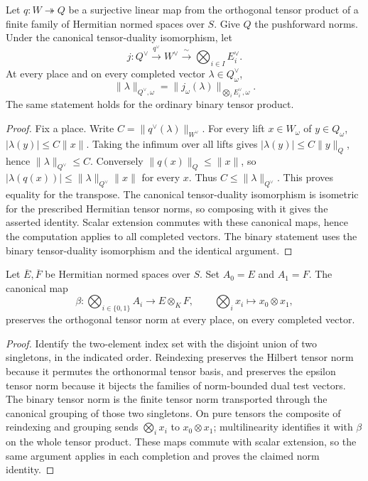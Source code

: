\begin{lemma}
\label{lem:tensor-quotient-dual-norm}
\leanok
Let $q:W\twoheadrightarrow Q$ be a surjective linear map from the orthogonal
tensor product of a finite family of Hermitian normed spaces over $S$.
Give $Q$ the pushforward norms. Under the canonical tensor-duality isomorphism,
let
\[
 j:Q^{\vee}\xrightarrow{q^{\vee}}W^{\vee}
       \xrightarrow{\ \sim\ }\bigotimes_{i\in I}E_i^{\vee}.
\]
At every place and on every completed vector $\lambda\in Q_\omega^{\vee}$,
\[
 \|\lambda\|_{Q^{\vee},\omega}
   =\|j_\omega(\lambda)\|_{\bigotimes_i E_i^{\vee},\omega}.
\]
The same statement holds for the ordinary binary tensor product.
\end{lemma}
\begin{proof}
Fix a place. Write $C=\|q^{\vee}(\lambda)\|_{W^{\vee}}$.
For every lift $x\in W_\omega$ of $y\in Q_\omega$,
$|\lambda(y)|\leq C\|x\|$. Taking the infimum over all lifts gives
$|\lambda(y)|\leq C\|y\|_Q$, hence $\|\lambda\|_{Q^{\vee}}\leq C$.
Conversely $\|q(x)\|_Q\leq\|x\|$, so
$|\lambda(q(x))|\leq\|\lambda\|_{Q^{\vee}}\|x\|$ for every $x$.
Thus $C\leq\|\lambda\|_{Q^{\vee}}$. This proves equality for the transpose.
The canonical tensor-duality isomorphism is isometric for the prescribed
Hermitian tensor norms, so composing with it gives the asserted identity.
Scalar extension commutes with these canonical maps, hence the computation
applies to all completed vectors. The binary statement uses the binary
tensor-duality isomorphism and the identical argument.
\end{proof}

\begin{lemma}
\label{lem:binary-tensor-norm}
\leanok
Let $\overline E,\overline F$ be Hermitian normed spaces over $S$. Set
$A_0=E$ and $A_1=F$. The canonical map
\[
 \beta:\bigotimes_{i\in\{0,1\}}A_i\longrightarrow E\otimes_K F,
 \qquad \bigotimes_i x_i\longmapsto x_0\otimes x_1,
\]
preserves the orthogonal tensor norm at every place, on every completed vector.
\end{lemma}
\begin{proof}
Identify the two-element index set with the disjoint union of two singletons,
in the indicated order. Reindexing preserves the Hilbert tensor norm because
it permutes the orthonormal tensor basis, and preserves the epsilon tensor
norm because it bijects the families of norm-bounded dual test vectors.
The binary tensor norm is the finite tensor norm transported through the
canonical grouping of those two singletons. On pure tensors the composite
of reindexing and grouping sends $\bigotimes_i x_i$ to $x_0\otimes x_1$;
multilinearity identifies it with $\beta$ on the whole tensor product.
These maps commute with scalar extension, so the same argument applies in
each completion and proves the claimed norm identity.
\end{proof}

